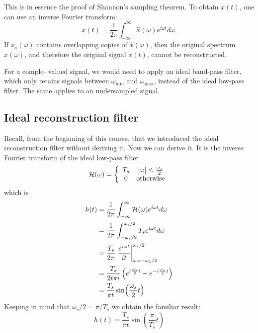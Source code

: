 This is in essence the proof of Shannon's sampling theorem. To obtain $x(t)$, 
one can use an inverse Fourier transform:
\begin{equation}
  x(t) = \frac{1}{2\pi}\int_{-\infty}^{\infty} \hat{x}(\omega) e^{i\omega t}d\omega.
\end{equation}
If $\hat{x}_s(\omega)$ contains overlapping copies of $\hat{x}(\omega)$, then the original 
spectrum $\hat{x}(\omega)$, and therefore the original signal $x(t)$, cannot be reconstructed.

For a comple- valued signal, we would need to apply an ideal band-pass filter, which only 
retains signals between $\omega_{\mathrm{min}}$ and
$\omega_{\mathrm{max}}$, instead of the ideal low-pass filter. The same applies to an undersampled signal.

\subsection{Ideal reconstruction filter}
Recall, from the beginning of this course, that we introduced the ideal reconstruction filter without deriving it. 
Now we can derive it. It is the inverse Fourier transform of the ideal low-pass filter
\begin{equation}
  \mathcal{H}(\omega) = \left\{ \begin{array}{cc}
    T_s & |\omega| \le \frac{\omega_s}{2} \\
    0   & \mathrm{otherwise}
  \end{array}
  \right.
\end{equation}
which is
\begin{align}
  h(t) & = \frac{1}{2\pi}\int_{-\infty}^{\infty} \mathcal{H}(\omega) e^{i\omega t}d\omega                             \\
       & = \frac{1}{2\pi} \int_{-\omega_s/2}^{\omega_s/2} T_s e^{i\omega t}d\omega                     \\
       & = \frac{T_s}{2 \pi}\left. \frac{e^{i\omega t}}{it} \right|_{\omega=-\omega_s/2}^{\omega_s/2}  \\
       & = \frac{T_s}{2 t \pi i}\left( e^{i\frac{\omega_s}{2} t}  - e^{-i\frac{\omega_s}{2} t} \right) \\
       & = \frac{T_s}{\pi t} \sin(\frac{\omega_s}{2}t)                                                 
\end{align}
Keeping in mind that $\omega_s/2 = \pi/T_s$ we obtain the familiar result:
\begin{equation}
  \boxed{
    h(t) = \frac{T_s}{\pi t}\sin(\frac{\pi}{T_s}t)
  }
\end{equation}
